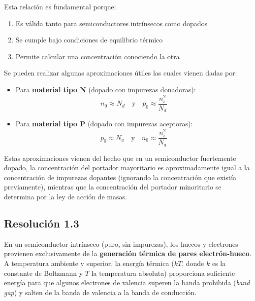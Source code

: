 \documentclass[
  11pt,
  letterpaper,
   addpoints,
   answers
  ]{exam}
\begin{document}
\begin{questions}
\begin{solution}
Esta relación es fundamental porque:
\begin{enumerate}
    \item Es válida tanto para semiconductores intrínsecos como dopados
    \item Se cumple bajo condiciones de equilibrio térmico
    \item Permite calcular una concentración conociendo la otra
\end{enumerate}

Se pueden realizar algunas aproximaciones útiles las cuales vienen dadas por:
\begin{itemize}
    \item Para \textbf{material tipo N} (dopado con impurezas donadoras):
    \begin{equation}
        n_0 \approx N_d \quad \text{y} \quad p_0 \approx \frac{n_i^2}{N_d}
    \end{equation}
    \item Para \textbf{material tipo P} (dopado con impurezas aceptoras):
    \begin{equation}
        p_0 \approx N_a \quad \text{y} \quad n_0 \approx \frac{n_i^2}{N_a}
    \end{equation}
\end{itemize}

Estas aproximaciones vienen del hecho que en un semiconductor fuertemente dopado, la concentración del portador mayoritario es aproximadamente igual a la concentración de impurezas dopantes (ignorando la concentración que existía previamente), mientras que la concentración del portador minoritario se determina por la ley de acción de masas.

\subsection*{Resolución 1.3}
En un semiconductor intrínseco (puro, sin impurezas), los huecos y electrones provienen exclusivamente de la \textbf{generación térmica de pares electrón-hueco}. A temperatura ambiente y superior, la energía térmica ($kT$, donde $k$ es la constante de Boltzmann y $T$ la temperatura absoluta) proporciona suficiente energía para que algunos electrones de valencia superen la banda prohibida (\emph{band gap}) y salten de la banda de valencia a la banda de conducción.


\end{solution}
\end{questions}
\end{document}
